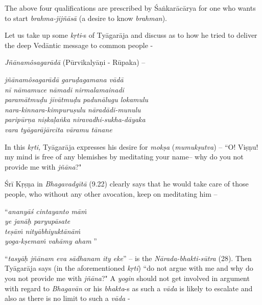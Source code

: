 \vspace{-.2cm}

The above four qualifications are prescribed by Śaṅkarācārya for one who wants to start \textit{brahma-jijñāsā} (a desire to know \textit{brahman}).

Let us take up some \textit{kṛti}-s of Tyāgarāja and discuss as to how he tried to deliver the deep Vedāntic message to common people -

\textit{Jñānamôsagarādā} (Pūrvikalyāṇi - Rūpaka) –

\begin{centerquote}
\textit{jñānamôsagarādā garuḍagamana vādā} \\ \textit{nī nāmamuce nāmadi nirmalamainadi} \\ \textit{paramātmuḍu jīvātmuḍu padunālugu lokamulu}\\ \textit{nara-kinnara-kimpuruṣulu nāradādi-munulu}\\ \textit{paripūrṇa niṣkaḷaṅka niravadhi-sukha-dāyaka}\\ \textit{vara tyāgarājārcita vāramu tānane}
\end{centerquote}

In this \textit{kṛti,} Tyāgarāja expresses his desire for \textit{mokṣa} (\textit{mumukṣutva}) – ``O! Viṣṇu! my mind is free of any blemishes by meditating your name– why do you not provide me with \textit{jñāna}?"

Śrī Kṛṣṇa in \textit{Bhagavadgītā} (9.22) clearly says that he would take care of those people, who without any other avocation, keep on meditating him –

\vspace{-.2cm}

\begin{centerquote}
“\textit{ananyāś cintayanto māṁ}\\ \textit{ye janāḥ paryupāsate }\\ \textit{teṣāṁ nityābhiyuktānāṁ}\\ \textit{yoga-kṣemaṁ vahāmy aham} ”
\end{centerquote}

“\textit{tasyāḥ jñānam eva sādhanam ity eke}” – is the \textit{Nārada-bhakti-sūtra} (28). Then Tyāgarāja says (in the aforementioned \textit{kṛti}) ``do not argue with me and why do you not provide me with \textit{jñāna}?" A \textit{yogin} should not get involved in argument with regard to \textit{Bhagavān} or his \textit{bhakta}-s as such a \textit{vāda} is likely to escalate and also as there is no limit to such a \textit{vāda} -

